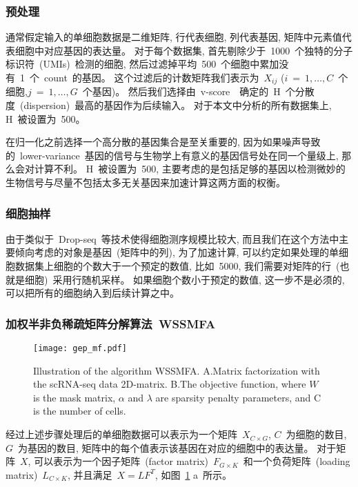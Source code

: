 \subsubsection{预处理}
通常假定输入的单细胞数据是二维矩阵, 行代表细胞, 列代表基因, 矩阵中元素值代表细胞中对应基因的表达量。
对于每个数据集, 首先剔除少于~1000~个独特的分子标识符~(UMIs)~检测的细胞,
然后过滤掉平均~500~个细胞中累加没有~1~个~count~的基因。
这个过滤后的计数矩阵我们表示为~$X_{ij}$ ($i~=~1,\ldots, C$~个细胞,$j~=~1,\ldots, G$~个基因)。
然后我们选择由~v-score~\cite{klein2015droplet}~确定的~H~个分散度~(dispersion)~最高的基因作为后续输入。
对于本文中分析的所有数据集上, H~被设置为~500。

在归一化之前选择一个高分散的基因集合是至关重要的, 
因为如果噪声导致的~lower-variance~基因的信号与生物学上有意义的基因信号处在同一个量级上, 那么会对计算不利。 
H~被设置为~500, 主要考虑的是包括足够的基因以检测微妙的生物信号与尽量不包括太多无关基因来加速计算这两方面的权衡。

\subsubsection{细胞抽样}
由于类似于~Drop-seq~等技术使得细胞测序规模比较大, 而且我们在这个方法中主要倾向考虑的对象是基因~(矩阵中的列), 
为了加速计算, 可以约定如果处理的单细胞数据集上细胞的个数大于一个预定的数值, 比如~5000,
我们需要对矩阵的行~(也就是细胞)~采用行随机采样。
如果细胞个数小于预定的数值, 这一步不是必须的, 可以把所有的细胞纳入到后续计算之中。

\subsubsection{加权半非负稀疏矩阵分解算法~WSSMFA}

\begin{figure}[!htbp]
    \centering
    \texttt{[image: gep\_mf.pdf]}
    \caption{
        Illustration of the algorithm WSSMFA.
        A.Matrix factorization with the scRNA-seq data 2D-matrix. 
        B.The objective function, where $W$ is the mask matrix, $\alpha$ and $\lambda$ are sparsity penalty parameters, and C is
        the number of cells.
    }
    \label{fig:gep-mf}
\end{figure}

经过上述步骤处理后的单细胞数据可以表示为一个矩阵~$X_{C \times G}$, $C$~为细胞的数目, $G$~为基因的数目, 
矩阵中的每个值表示该基因在对应的细胞中的表达量。
对于矩阵~$X$, 可以表示为一个因子矩阵~(factor matrix)~$F_{G \times K}$~和一个负荷矩阵~(loading matrix)~$L_{C \times K}$,
并且满足~$X=LF^T$, 如图~\ref{fig:gep-mf} a~所示。 

